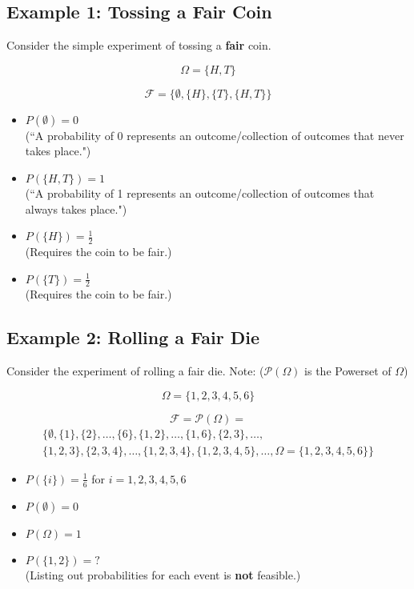 \documentclass{article}
\begin{document}
\subsection*{Example 1: Tossing a Fair Coin}
Consider the simple experiment of tossing a \textbf{fair} coin.

\[
\Omega = \{H, T\}
\]

\[
\mathcal{F} = \{\emptyset, \{H\}, \{T\}, \{H, T\}\}
\]

\begin{itemize}
    \item \(P(\emptyset) = 0\) \\
    (``A probability of 0 represents an outcome/collection of outcomes that never takes place.")
    
    \item \(P(\{H, T\}) = 1\) \\
    (``A probability of 1 represents an outcome/collection of outcomes that always takes place.")
    
    \item \(P(\{H\}) = \frac{1}{2}\) \\
    (Requires the coin to be fair.)
    
    \item \(P(\{T\}) = \frac{1}{2}\) \\
    (Requires the coin to be fair.)
\end{itemize}

\subsection*{Example 2: Rolling a Fair Die}
Consider the experiment of rolling a fair die. Note: (\(\mathcal{P}(\Omega)\) is the Powerset of \(\Omega\))

\[
\Omega = \{1, 2, 3, 4, 5, 6\}
\]

\[
\mathcal{F} = \mathcal{P}(\Omega) =
\]
\[
\begin{aligned}
\{\emptyset, \{1\}, \{2\}, \ldots, \{6\}, \{1, 2\}, \ldots, \{1, 6\}, \{2, 3\}, \ldots, \\
\{1, 2, 3\}, \{2, 3, 4\}, \ldots, \{1, 2, 3, 4\}, \{1, 2, 3, 4, 5\}, \ldots, \Omega = \{1, 2, 3, 4, 5, 6\}\}
\end{aligned}
\]

\begin{itemize}
    \item \(P(\{i\}) = \frac{1}{6}\) for \(i = 1, 2, 3, 4, 5, 6\)
    \item \(P(\emptyset) = 0\)
    \item \(P(\Omega) = 1\)
    \item \(P(\{1, 2\}) = ?\) \\
    (Listing out probabilities for each event is \textbf{not} feasible.)
\end{itemize}
\end{document}
